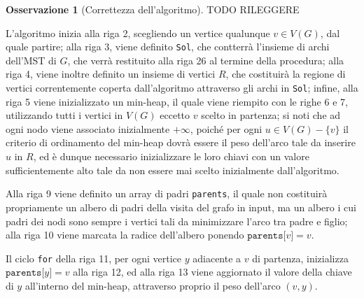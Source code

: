 \documentclass[14pt]{extreport}
\theoremstyle{definition}
\theoremstyle{definition}
\newtheorem{remark}{Osservazione}[subsection]
\begin{document}
\begin{remark}[Correttezza dell'algoritmo]
    TODO RILEGGERE

    L'algoritmo inizia alla riga 2, scegliendo un vertice qualunque $v \in V(G)$, dal quale partire; alla riga 3, viene definito \texttt{Sol}, che contterrà l'insieme di archi dell'MST di $G$, che verrà restituito alla riga 26 al termine della procedura; alla riga 4, viene inoltre definito un insieme di vertici $R$, che costituirà la regione di vertici correntemente coperta dall'algoritmo attraverso gli archi in \texttt{Sol}; infine, alla riga 5 viene inizializzato un min-heap, il quale viene riempito con le righe 6 e 7, utilizzando tutti i vertici in $V(G)$ eccetto $v$ scelto in partenza; si noti che ad ogni nodo viene associato inizialmente $+ \infty$, poiché per ogni $u \in V(G) - \{v\}$ il criterio di ordinamento del min-heap dovrà essere il peso dell'arco tale da inserire $u$ in $R$, ed è dunque necessario inizializzare le loro chiavi con un valore sufficientemente alto tale da non essere mai scelto inizialmente dall'algoritmo.

    Alla riga 9 viene definito un array di padri \texttt{parents}, il quale non costituirà propriamente un albero di padri della visita del grafo in input, ma un albero i cui padri dei nodi sono sempre i vertici tali da minimizzare l'arco tra padre e figlio; alla riga 10 viene marcata la radice dell'albero ponendo $\texttt{parents[}v\texttt{]} = v$.

    Il ciclo \texttt{for} della riga 11, per ogni vertice $y$ adiacente a $v$ di partenza, inizializza $\texttt{parents[}y\texttt{]} = v$ alla riga 12, ed alla riga 13 viene aggiornato il valore della chiave di $y$ all'interno del min-heap, attraverso proprio il peso dell'arco $(v, y)$.


\end{remark}
\end{document}
